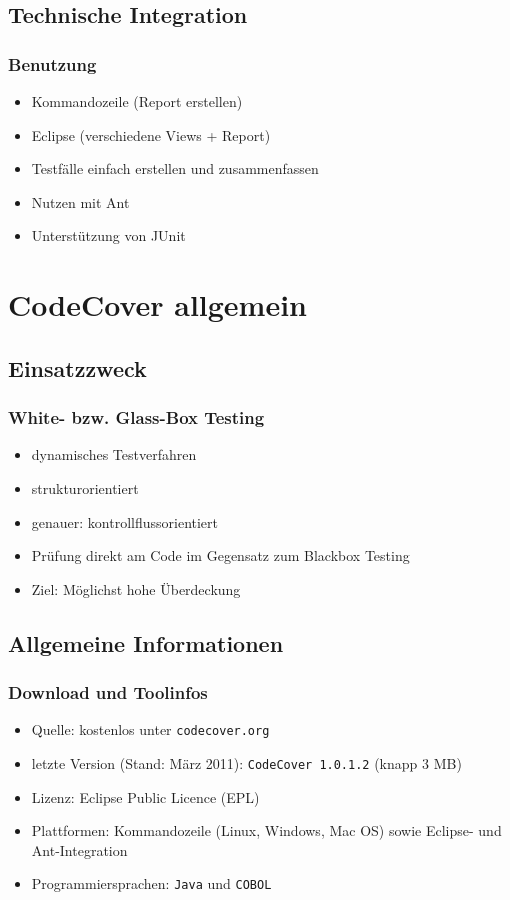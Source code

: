 \documentclass{beamer}
\begin{document}
  \subsection{Technische Integration}
  \begin{frame}\frametitle{Benutzung}
    \begin{itemize}
      \item Kommandozeile (Report erstellen)
      \item Eclipse (verschiedene Views + Report)
      \item Testfälle einfach erstellen und zusammenfassen
      \item Nutzen mit Ant
      \item Unterstützung von JUnit
    \end{itemize}
  \end{frame}

  \section{CodeCover allgemein}
  \subsection{Einsatzzweck}
  \begin{frame}\frametitle{White- bzw. Glass-Box Testing}
    \begin{itemize}
      \item dynamisches Testverfahren
      \item strukturorientiert
      \item genauer: kontrollflussorientiert
      \item Prüfung direkt am Code im Gegensatz zum Blackbox Testing
      \item Ziel: Möglichst hohe Überdeckung
    \end{itemize}
  \end{frame}

  \subsection{Allgemeine Informationen}
  \begin{frame}\frametitle{Download und Toolinfos}
    \begin{itemize}
      \item Quelle: kostenlos unter \texttt{codecover.org}
      \item letzte Version (Stand: März 2011): \texttt{CodeCover 1.0.1.2} (knapp 3 MB)
      \item Lizenz: Eclipse Public Licence (EPL)
      \item Plattformen: Kommandozeile (Linux, Windows, Mac OS) sowie Eclipse- und Ant-Integration
      \item Programmiersprachen: \texttt{Java} und \texttt{COBOL}
    \end{itemize}
  \end{frame}
\end{document}
